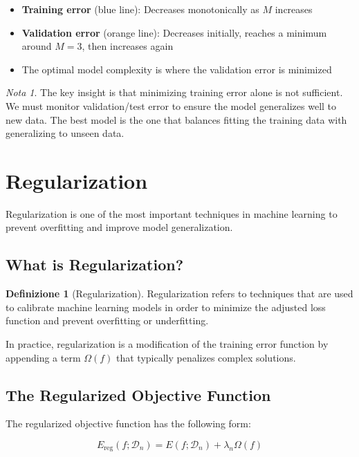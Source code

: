 \documentclass[11pt,a4paper]{article}
\theoremstyle{definition}
\newtheorem{definition}{Definizione}[section]
\theoremstyle{plain}
\theoremstyle{remark}
\newtheorem*{remark}{Nota}
\begin{document}
\begin{itemize}
    \item \textbf{Training error} (blue line): Decreases monotonically as $M$ increases
    \item \textbf{Validation error} (orange line): Decreases initially, reaches a minimum around $M = 3$, then increases again
    \item The optimal model complexity is where the validation error is minimized
\end{itemize}

\begin{remark}
The key insight is that minimizing training error alone is not sufficient. We must monitor validation/test error to ensure the model generalizes well to new data. The best model is the one that balances fitting the training data with generalizing to unseen data.
\end{remark}

\section{Regularization}

Regularization is one of the most important techniques in machine learning to prevent overfitting and improve model generalization.

\subsection{What is Regularization?}

\begin{definition}[Regularization]
Regularization refers to techniques that are used to calibrate machine learning models in order to minimize the adjusted loss function and prevent overfitting or underfitting.
\end{definition}

In practice, regularization is a modification of the training error function by appending a term $\Omega(f)$ that typically penalizes complex solutions.

\subsection{The Regularized Objective Function}

The regularized objective function has the following form:

\[
E_{\text{reg}}(f; \mathcal{D}_n) = E(f; \mathcal{D}_n) + \lambda_n \Omega(f)
\]
\end{document}

